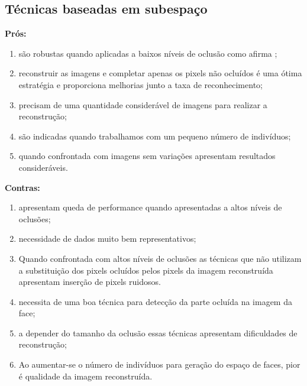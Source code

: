 \subsection{Técnicas baseadas em subespaço}

\noindent \textbf{Prós:}
\begin{enumerate}
\item são robustas quando aplicadas a baixos níveis de oclusão como afirma ;
\item reconstruir as imagens e completar apenas os pixels não ocluídos é uma ótima estratégia e proporciona melhorias junto a taxa de reconhecimento;


\item precisam de uma quantidade considerável de imagens para realizar a reconstrução;

\item são indicadas quando trabalhamos com um pequeno número de indivíduos;

\item quando confrontada com imagens sem variações apresentam resultados consideráveis.


\end{enumerate}

\noindent \textbf{Contras:}

\begin{enumerate}

\item apresentam queda de performance quando apresentadas a altos níveis de oclusões;

\item necessidade de dados muito bem representativos;

\item Quando confrontada com altos níveis de oclusões as técnicas que não utilizam a substituição dos pixels ocluídos pelos pixels da imagem reconstruída apresentam inserção de pixels ruidosos.

\item necessita de uma boa técnica para detecção da parte ocluída na imagem da face;

\item a depender do tamanho da oclusão essas técnicas apresentam dificuldades de reconstrução;

\item Ao aumentar-se o número de indivíduos para geração do espaço de faces, pior é qualidade da imagem reconstruída.


\end{enumerate}

